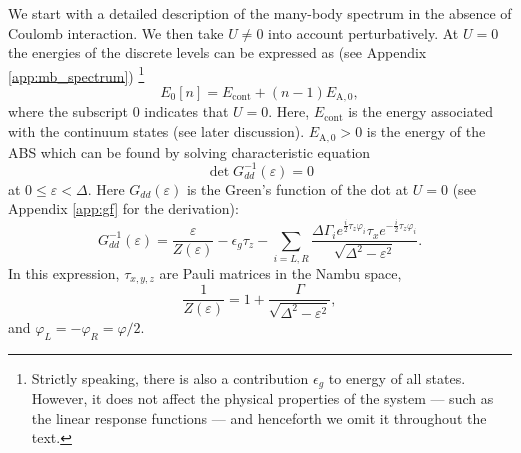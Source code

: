 \documentclass[aps,reprint,longbibliography, prb]{revtex4-2}
\begin{document}
We start with a detailed description of the many-body spectrum in the absence of Coulomb interaction. We then take $U\neq 0$ into account perturbatively. At $U = 0$ the energies of the discrete levels can be expressed as (see Appendix \ref{app:mb_spectrum}) \footnote{Strictly speaking, there is also a contribution $\epsilon_g$ to energy of all states. However, it does not affect the physical properties of the system --- such as the linear response functions --- and henceforth we omit it throughout the text.}
\begin{equation}
\label{eq:unpert}
E_\mathrm{0}[n] = E_\mathrm{cont} + (n - 1) E_\mathrm{A,0},
\end{equation}
where the subscript $0$ indicates that $U = 0$. Here, $E_\mathrm{cont}$ is the energy associated with the continuum states (see later discussion). $E_{\mathrm{A,0}} > 0$ is the energy of the ABS which can be found by solving characteristic equation
\begin{equation}\label{eq:abs_unp_energy}
\det G_{dd}^{-1}(\varepsilon) = 0
\end{equation}
at $0 \leq \varepsilon < \Delta$. Here $G_{dd}(\varepsilon)$ is the Green's function of the dot at $U = 0$ (see Appendix \ref{app:gf} for the derivation):
\begin{equation}
\label{eq:G-inv}
G^{-1}_{dd}(\varepsilon) = \frac{\varepsilon}{Z(\varepsilon)} - \epsilon_g\tau_z - \sum_{i=L,R}\frac{\Delta\Gamma_i e^{\frac{i}{2} \tau_z \varphi_i} \tau_x e^{-\frac{i}{2} \tau_z \varphi_i}}{\sqrt{\Delta^2 - \varepsilon^2}}.
\end{equation}
In this expression, $\tau_{x,y,z}$ are Pauli matrices in the Nambu space,
\begin{equation}
\label{eq:Z}
\frac{1}{Z(\varepsilon)} = 1 + \frac{\Gamma}{\sqrt{\Delta^2 - \varepsilon^2}},   
\end{equation}
and $\varphi_L = -\varphi_R = \varphi/2$.
\end{document}
